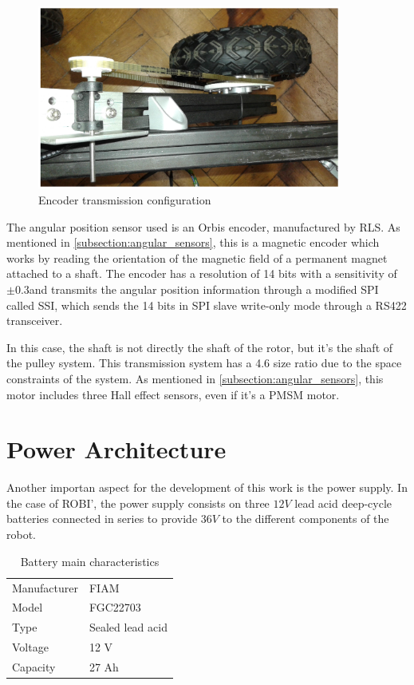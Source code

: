 \begin{figure}[htbp]
\centering
\includegraphics[width=10cm]{Images/orbis_pulley.png} 
\caption[Encoder Transmission Configuration]{Encoder transmission configuration}
\label{fig:orbis_pulley}
\end{figure}

The angular position sensor used is an Orbis encoder, manufactured by RLS. As mentioned in \ref{subsection:angular_sensors}, this is a magnetic encoder which works by reading the orientation of the magnetic field of a permanent magnet attached to a shaft. The encoder has a resolution of 14 bits with a sensitivity of $\pm0.3$\degree and transmits the angular position information through a modified \acf{SPI} called \acf{SSI}, which sends the 14 bits in \ac{SPI} slave write-only mode through a RS422 transceiver. 

In this case, the shaft is not directly the shaft of the rotor, but it's the shaft of the pulley system. This transmission system has a 4.6 size ratio due to the space constraints of the system. As mentioned in \ref{subsection:angular_sensors}, this motor includes three Hall effect sensors, even if it's a \ac{PMSM} motor.

\section{Power Architecture}

Another importan aspect for the development of this work is the power supply. In the case of ROBI', the power supply consists on three $12V$ lead acid deep-cycle batteries connected in series to provide $36V$ to the different components of the robot.

\begin{table}[]
\centering
\caption{Battery main characteristics}
\label{table:battery}
\begin{tabular}{@{}ll@{}}
\toprule
Manufacturer	&	FIAM				\\
Model			&	FGC22703			\\
Type			&	Sealed lead acid 	\\
Voltage			&	12 V 				\\
Capacity 		&  	27 Ah 				\\
\bottomrule
\end{tabular}
\end{table}

